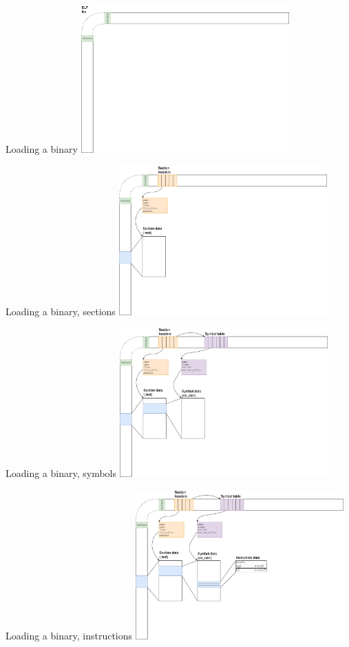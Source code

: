 \documentclass{beamer}
\begin{document}
  \begin{frame}{Loading a binary}
    \includegraphics[width=8cm]{elf_background}
  \end{frame}

  \begin{frame}{Loading a binary, sections}
    \includegraphics[width=8cm]{elf_sections}
  \end{frame}

  \begin{frame}{Loading a binary, symbols}
    \includegraphics[width=8cm]{elf_symbols}
  \end{frame}

  \begin{frame}{Loading a binary, instructions}
    \includegraphics[width=8cm]{elf_instructions}
  \end{frame}
\end{document}
